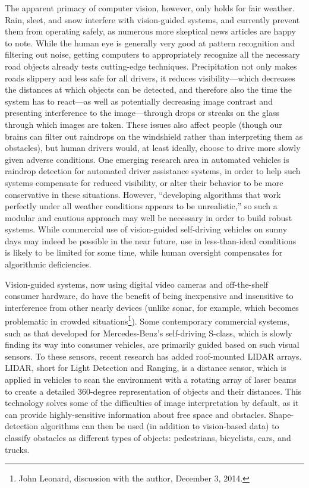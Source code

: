 The apparent primacy of computer vision, however, only holds for fair
weather. Rain, sleet, and 
snow interfere with vision-guided systems, and currently prevent them
from operating safely, as numerous more skeptical news articles are
happy to note.\cite{knightFurther}\cite{gomesObstacles} While the
human eye is generally very good at
pattern recognition and filtering out noise, getting computers to
appropriately recognize all 
the necessary road objects already tests
cutting-edge techniques. Precipitation not only makes roads slippery
and less safe for all drivers, it reduces visibility---which decreases
the distances at which objects can be detected, and therefore also the
time the system has to react---as well as potentially decreasing image
contrast and presenting interference to the image---through drops or
streaks on the glass through which images are taken.\cite{???-rainACAS} These issues also
affect people (though our brains can filter out raindrops on the
windshield rather than interpreting them as obstacles), but human
drivers would, at least ideally, choose to drive more slowly given
adverse conditions. One emerging research area
in automated vehicles is raindrop detection for automated driver
assistance systems, in order to help such systems compensate for
reduced visibility, or alter their behavior to be more conservative in
these situations. However, ``developing algorithms that work perfectly
under all weather conditions appears to be unrealistic,'' so such a
modular and cautious approach may well be necessary in order to build
robust systems.\cite{???-rainACAS} While commercial use of
vision-guided self-driving vehicles on 
sunny days may indeed be possible in the near future, use in
less-than-ideal conditions is likely to be limited for some time,
while human oversight compensates for algorithmic deficiencies. 

Vision-guided systems, now using digital video cameras and
off-the-shelf consumer hardware, do have the benefit of being inexpensive
and insensitive to interference from other nearly devices (unlike
sonar, for example, which becomes problematic in crowded
situations\footnote{John Leonard, discussion with the author, December
3, 2014.}). Some contemporary commercial systems, such as that developed for Mercedes-Benz's
self-driving S-class, which is slowly finding its way into consumer
vehicles, are primarily guided based on such visual sensors.\cite{???} To
these sensors, recent research has added roof-mounted LIDAR arrays.
LIDAR, short for Light Detection and Ranging, is a distance
sensor, which is applied in vehicles to scan the environment with a
rotating array of laser beams to create a detailed 360-degree
representation of objects and their distances. This technology
solves some of the difficulties of image interpretation by default, as
it can provide highly-sensitive information about free space and
obstacles. Shape-detection algorithms can then be used (in addition to
vision-based data) to classify obstacles as different types of
objects: pedestrians, bicyclists, cars, and trucks.\cite{???}

